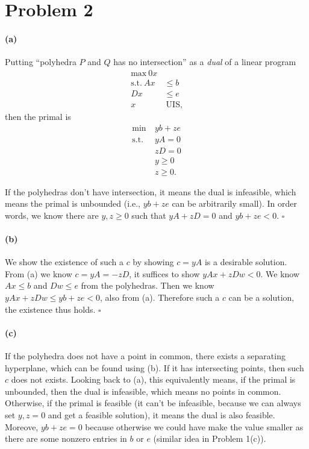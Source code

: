\documentclass[12pt]{article}
\begin{document}
\section*{Problem 2}
\paragraph{(a)}
Putting ``polyhedra $P$ and $Q$ has no intersection'' as a \emph{dual} of a linear program
\begin{align*}
\text{max} ~ 0x& \\
\text{s.t.} ~ Ax &\leq b\\
 Dx &\leq e\\
 x&~\text{UIS},
\end{align*}
then the primal is 
\begin{align*}
\text{min} ~ &yb + ze \\
\text{s.t.} ~ &yA = 0\\
&zD = 0\\
&y \geq 0\\
&z \geq 0.
\end{align*}

If the polyhedras don't have intersection, it means the dual is infeasible, which means the primal is unbounded (i.e., $yb +ze$ can be arbitrarily small). In order words, we know there are $y, z \geq 0$ such that $yA + zD = 0$ and $yb +ze < 0$. $\square$

\paragraph{(b)} We show the existence of such a $c$ by showing $c=yA$ is a desirable solution. From (a) we know $c=yA=-zD$, it suffices to show $yAx + zDw <0$. We know $Ax \leq b$ and $Dw \leq e$ from the polyhedras. Then we know $yAx + zDw \leq yb + ze < 0$, also from (a). Therefore such a $c$ can be a solution, the existence thus holds. $\square$

\paragraph{(c)} If the polyhedra does not have a point in common, there exists a separating hyperplane, which can be found using (b). If it has intersecting points, then such $c$ does not exists. Looking back to (a), this equivalently means, if the primal is unbounded, then the dual is infeasible, which means no points in common. Otherwise, if the primal is feasible (it can't be infeasible, because we can always set $y, z =0$ and get a feasible solution), it means the dual is also feasible. Moreove, $yb+ze=0$ because otherwise we could have make the value smaller as there are some nonzero entries in $b$ or $e$ (similar idea in Problem 1(c)).
\end{document}
